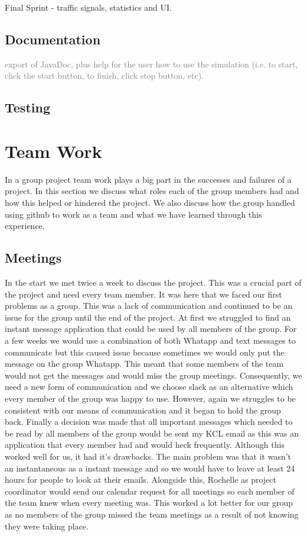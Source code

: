 \documentclass{article}
\begin{document}
Final Sprint - traffic signals, statistics and UI. 

	\subsection{Documentation}
		\textcolor{gray}{export of JavaDoc, plus help for the user how to use the simulation (i.e. to start, click the start button, to finish, click stop button, etc).}
		
		
	\subsection{Testing}

\section{Team Work}
In a group project team work plays a big part in the successes and failures of a project. In this section we discuss what roles each of the group members had and how this helped or hindered the project. We also discuss how the group handled using github to work as a team and what we have learned through this experience. 

\subsection{Meetings}
 In the start we met twice a week to discuss the project. This was a crucial part of the project and need every team member. It was here that we faced our first problems as a group. This was a lack of communication and continued to be an issue for the group until the end of the project. At first we struggled to find an instant message application that could be used by all members of the group. For a few weeks we would use a combination of both Whatapp and text messages to communicate but this caused issue because sometimes we would only put the message on the group Whatapp. This meant that some members of the team would not get the messages and would miss the group meetings. Consequently, we need a new form of communication and we choose slack as an alternative which every member of the group was happy to use. However, again we struggles to be consistent with our means of communication and it began to hold the group back. Finally a decision was made that all important messages which needed to be read by all members of the group would be sent my KCL email as this was an application that every member had and would heck frequently. Although this worked well for us, it had it's drawbacks. The main problem was that it wasn't an instantaneous as a instant message and so we would have to leave at least 24 hours for people to look at their emails. Alongside this, Rochelle as project coordinator would send our calendar request for all meetings so each member of the team knew when every meeting was. This worked a lot better for our group as no members of the group missed the team meetings as a result of not knowing they were taking place. 
 
\end{document}

